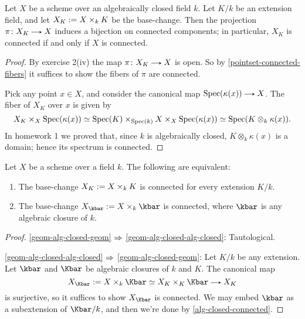 \begin{proposition}
  \label{alg-closed-connected}
  Let $X$ be a scheme over an algebraically closed field $k$. Let $K/k$ be an extension field, and let $X_K \mathrel{:=} X \times_k K$ be the base-change. Then the projection $\pi \c X_K \to X$ induces a bijection on connected components; in particular, $X_K$ is connected if and only if $X$ is connected.

  \begin{proof}
    By exercise 2(iv) the map $\pi \c X_K \to X$ is open. So by \cref{pointset-connected-fibers} it suffices to show the fibers of $\pi$ are connected.

    Pick any point $x \in X$, and consider the canonical map $\Spec(\kappa(x)) \to X$. The fiber of $X_K$ over $x$ is given by
    \[
      X_K \times_X \operatorname{Spec}(\kappa(x)) \simeq \operatorname{Spec}(K) \times_{\operatorname{Spec}(k)} X \times_X \operatorname{Spec}(\kappa(x)) \simeq \operatorname{Spec}(K \otimes_k \kappa(x)).
    \]
    In homework 1 we proved that, since $k$ is algebraically closed, $K \otimes_k \kappa(x)$ is a domain; hence its spectrum is connected.
  \end{proof}
\end{proposition}

\begin{proposition}
  \label{geom-alg-closed}
  Let $X$ be a scheme over a field $k$. The following are equivalent:
  \begin{enumerate}
  \item \label{geom-alg-closed-geom} The base-change $X_K \mathrel{:=} X \times_k K$ is connected for every extension $K/k$.
  \item \label{geom-alg-closed-alg-closed} The base-change $X_{\kbar} \ce X \times_k \kbar$ is connected, where $\kbar$ is any algebraic closure of $k$.
  \end{enumerate}

  \begin{proof}
    \cref{geom-alg-closed-geom} $\Rightarrow$ \cref{geom-alg-closed-alg-closed}: Tautological.

    \cref{geom-alg-closed-alg-closed} $\Rightarrow$ \cref{geom-alg-closed-geom}:  Let $K/k$ be any extension. Let $\kbar$ and $\Kbar$ be algebraic closures of $k$ and $K$. The canonical map
    \[
      X_{\Kbar} \ce X \times_k \Kbar \iso X_K \times_K \Kbar \to X_K
    \]
    is surjective, so it suffices to show $X_{\Kbar}$ is connected. We may embed $\kbar$ as a subextension of $\Kbar/k$, and then we're done by \cref{alg-closed-connected}.
  \end{proof}
\end{proposition}

